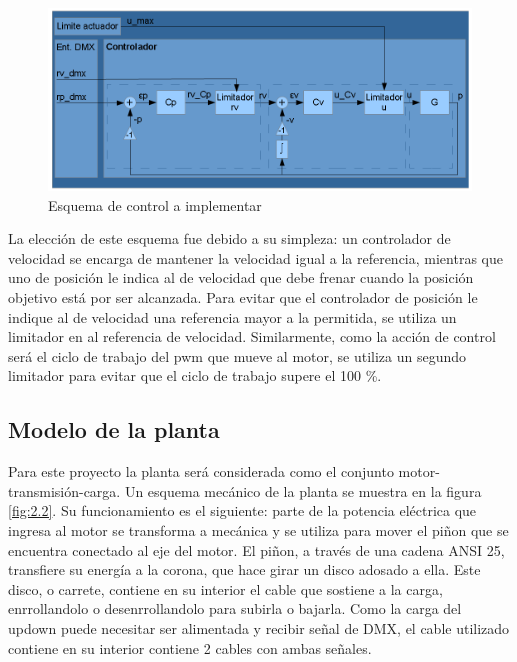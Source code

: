 \begin{figure}[!ht]
	\centering
	\includegraphics[width=16cm,scale=1]{resources/2_1-diagramaControlador.png}
	\caption{Esquema de control a implementar}
	\label{fig:\thefigure}
\end{figure}

La elección de este esquema fue debido a su simpleza: un controlador de velocidad se encarga de mantener la velocidad igual a la referencia, mientras que uno de posición le indica al de velocidad que debe frenar cuando la posición objetivo está por ser alcanzada. Para evitar que el controlador de posición le indique al de velocidad una referencia mayor a la permitida, se utiliza un limitador en al referencia de velocidad. Similarmente, como la acción de control será el ciclo de trabajo del pwm que mueve al motor, se utiliza un segundo limitador para evitar que el ciclo de trabajo supere el 100 \%.

\subsection{Modelo de la planta}
Para este proyecto la planta será considerada como el conjunto motor-transmisión-carga. Un esquema mecánico de la planta se muestra en la figura \ref{fig:2.2}. Su funcionamiento es el siguiente: parte de la potencia eléctrica que ingresa al motor se transforma a mecánica y se utiliza para mover el piñon que se encuentra conectado al eje del motor. El piñon, a través de una cadena ANSI 25, transfiere su energía a la corona, que hace girar un disco adosado a ella. Este disco, o carrete, contiene en su interior el cable que sostiene a la carga, enrrollandolo o desenrrollandolo para subirla o bajarla. Como la carga del updown puede necesitar ser alimentada y recibir señal de DMX, el cable utilizado contiene en su interior contiene 2 cables con ambas señales.

